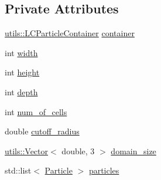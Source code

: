 \subsection*{Private Attributes}
\begin{DoxyCompactItemize}
\item 
\hyperlink{classutils_1_1LCParticleContainer}{utils\-::\-L\-C\-Particle\-Container} \hyperlink{classLCInnerParticleIteratorTest_a8f9c568f79dbbe24bbd49a7cb5bea7f1}{container}
\item 
int \hyperlink{classLCInnerParticleIteratorTest_a05fd0158904ae918a9fa58d22fadfe98}{width}
\item 
int \hyperlink{classLCInnerParticleIteratorTest_a31a40948facb70846156b5c374e3465b}{height}
\item 
int \hyperlink{classLCInnerParticleIteratorTest_a154bfbcc8fbcaebb1a1e4a6139a0e822}{depth}
\item 
int \hyperlink{classLCInnerParticleIteratorTest_a0e1dbc80d10588e1089c689310dc6789}{num\-\_\-of\-\_\-cells}
\item 
double \hyperlink{classLCInnerParticleIteratorTest_a791b6f201aef3f978e65056980828704}{cutoff\-\_\-radius}
\item 
\hyperlink{classutils_1_1Vector}{utils\-::\-Vector}$<$ double, 3 $>$ \hyperlink{classLCInnerParticleIteratorTest_a9899df5843acade8a21c9f1b50a19fef}{domain\-\_\-size}
\item 
std\-::list$<$ \hyperlink{classParticle}{Particle} $>$ \hyperlink{classLCInnerParticleIteratorTest_a06041919ff77a8f00537ee269be27f25}{particles}
\end{DoxyCompactItemize}


